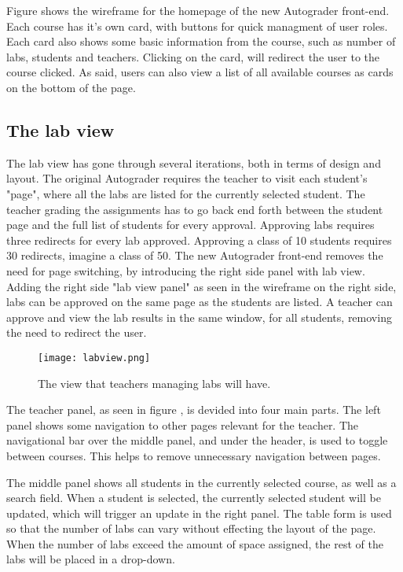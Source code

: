 Figure  shows the wireframe for the homepage of the new Autograder front-end. Each course has it's own card, with buttons for quick managment of user roles. Each card also shows some basic information from the course, such as number of labs, students and teachers. Clicking on the card, will redirect the user to the course clicked. As said, users can also view a list of all available courses as cards on the bottom of the page.

\subsection{The lab view}
The lab view has gone through several iterations, both in terms of design and layout. The original Autograder requires the teacher to visit each student's "page", where all the labs are listed for the currently selected student. The teacher grading the assignments has to go back end forth between the student page and the full list of students for every approval. Approving labs requires three redirects for every lab approved. Approving a class of 10 students requires 30 redirects, imagine a class of 50. The new Autograder front-end removes the need for page switching, by introducing the right side panel with lab view. Adding the right side "lab view panel" as seen in the wireframe on the right side, labs can be approved on the same page as the students are listed. A teacher can approve and view the lab results in the same window, for all students, removing the need to redirect the user.

\begin{figure}[h!]
	 \centering
   \texttt{[image: labview.png]}
   \caption{The view that teachers managing labs will have.}
   \label{fig:Wireframes for the new Autograder front-end}
\end{figure}

The teacher panel, as seen in figure , is devided into four main parts. The left panel shows some navigation to other pages relevant for the teacher. The navigational bar over the middle panel, and under the header, is used to toggle between courses. This helps to remove unnecessary navigation between pages.

The middle panel shows all students in the currently selected course, as well as a search field. When a student is selected, the currently selected student will be updated, which will trigger an update in the right panel. The table form is used so that the number of labs can vary without effecting the layout of the page. When the number of labs exceed the amount of space assigned, the rest of the labs will be placed in a drop-down.

